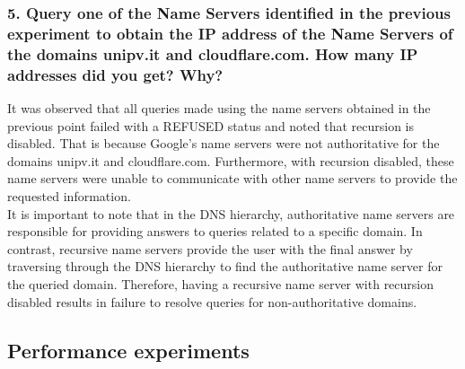 \documentclass[eng]{class}
\begin{document}
\subsubsection*{5. Query one of the Name Servers identified in the previous experiment to obtain the
  IP address of the Name Servers of the domains unipv.it and
  cloudflare.com. How many IP addresses did you get? Why?}
It was observed that all queries made using the name servers obtained in the previous point failed with a REFUSED status and noted that recursion is disabled.
That is because Google's name servers were not authoritative for the domains unipv.it and cloudflare.com.
Furthermore, with recursion disabled, these name servers were unable to communicate with other name servers to provide the requested information.\\
It is important to note that in the DNS hierarchy, authoritative name servers are responsible for providing answers to queries related to a specific domain.
In contrast, recursive name servers provide the user with the final answer by traversing through the DNS hierarchy to find the authoritative name server for the queried domain.
Therefore, having a recursive name server with recursion disabled results in failure to resolve queries for non-authoritative domains.
\subsection{Performance experiments}
\end{document}
